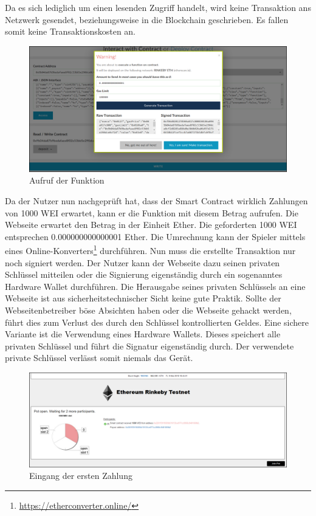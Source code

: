 \noindent Da es sich lediglich um einen lesenden Zugriff handelt, wird keine Transaktion ans Netzwerk gesendet, beziehungsweise in die Blockchain geschrieben. Es fallen somit keine Transaktionskosten an.

\begin{figure}[H]
\centering
\includegraphics[width=1\linewidth]{Figures/eth_gui/ETH_wallet_deposit}
\decoRule
\caption{Aufruf der  Funktion}
\label{fig:ETH_wallet_deposit}
\end{figure}

\noindent Da der Nutzer nun nachgeprüft hat, dass der Smart Contract wirklich Zahlungen von 1000 WEI erwartet, kann er die  Funktion mit diesem Betrag aufrufen.
Die Webseite erwartet den Betrag in der Einheit Ether. Die geforderten 1000 WEI entsprechen 0.000000000000001 Ether. Die Umrechnung kann der Spieler mittels eines Online-Konverters\footnote{\url{https://etherconverter.online/}} durchführen.
Nun muss die erstellte Transaktion nur noch signiert werden. Der Nutzer kann der Webseite dazu seinen privaten Schlüssel mitteilen oder die Signierung eigenständig durch ein sogenanntes Hardware Wallet durchführen. Die Herausgabe seines privaten Schlüssels an eine Webseite ist aus sicherheitstechnischer Sicht keine gute Praktik. Sollte der Webseitenbetreiber böse Absichten haben oder die Webseite gehackt werden, führt dies zum Verlust des durch den Schlüssel kontrollierten Geldes. Eine sichere Variante ist die Verwendung eines Hardware Wallets. Dieses speichert alle privaten Schlüssel und führt die Signatur eigenständig durch. Der verwendete private Schlüssel verlässt somit niemals das Gerät. 

\begin{figure}[H]
\centering
\includegraphics[width=1\linewidth]{Figures/eth_gui/ETH_pot_1}
\decoRule
\caption{Eingang der ersten Zahlung}
\label{fig:ETH_pot_1}
\end{figure}

